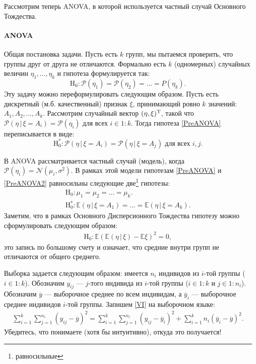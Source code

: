 Рассмотрим теперь ANOVA, в которой используется частный случай Основного Тождества.
\paragraph{ANOVA}
Общая постановка задачи.
Пусть есть $k$ групп, мы пытаемся проверить, что группы друг от друга не отличаются.
Формально есть $k$ (одномерных) случайных величин $\eta_1, \ldots, \eta_k$ и гипотеза формулируется так:
\begin{equation}
    \label{PreANOVA}
    \mathrm H_0: \mathcal P(\eta_1) = \mathcal P(\eta_2) = \ldots \mathcal =P(\eta_k).
\end{equation}
Эту задачу можно переформулировать следующим образом.
Пусть есть дискретный (м.б. качественный) признак $\xi$, принимающий ровно $k$ значений: $A_1, A_2, \ldots, A_k$.
Рассмотрим случайный вектор $(\eta, \xi)^{\mathrm{T}}$, такой что $\mathcal P(\eta \, | \, \xi = A_i) = \mathcal P(\eta_i)$ для всех $i \in 1:k$.
Тогда гипотеза \eqref{PreANOVA} переписывается в виде:
\begin{equation}
    \label{PreANOVA2}
    \mathrm H_0^*: \mathcal P(\eta \, | \, \xi = A_i) = \mathcal P(\eta \, | \, \xi = A_j) \text{ для всех $i, j$}.
\end{equation}

В ANOVA рассматривается частный случай (модель), когда $\mathcal P(\eta_i) = \mathcal N(\mu_i, \sigma^2)$.
В рамках этой модели гипотезам \eqref{PreANOVA} и \eqref{PreANOVA2} равносильны следующие две\footnote{равносильные} гипотезы:
\begin{gather}
    \label{ANOVA}
    \mathrm H_0: \mu_1 = \mu_2 = \ldots = \mu_k.\\
    \mathrm H_0^*: \mathbb E (\eta \, | \, \xi = A_1) = \ldots = \mathbb E (\eta \, | \, \xi = A_k).
\end{gather}
Заметим, что в рамках Основного Дисперсионного Тождества гипотезу можно сформулировать следующим образом:
\begin{gather}
    \label{ANOVA_VI_H}
    \mathrm H_0: \mathbb E(\mathbb E(\eta\, | \, \xi) - \mathbb E \xi)^2 = 0,
\end{gather}
это запись по большому счету и означает, что средние внутри групп не отличаются от общего среднего.

Выборка задается следующим образом: имеется $n_i$ индивидов из $i$-той группы ($i \in 1:k$).
Обозначим $y_{ij}$ --- $j$-того индивида из $i$-той группы ($i \in 1:k$ и $j \in 1:n_i$).
Обозначим $\overline y$ --- выборочное среднее по всем индивидам, а $\overline y_i$ --- выборочное среднее индивидов $i$-той группы.
Запишем \eqref{VI} на выборочном языке:
\begin{gather}
    \label{VI_ANOVA}
    \sum_{i=1}^k \sum_{j=1}^{n_i} (y_{ij} - \overline y)^2 = \sum_{i=1}^k \sum_{j=1}^{n_i} (y_{ij} - \overline y_i)^2 + \sum_{i=1}^k n_i (\overline y_i - \overline y)^2.
\end{gather}
Убедитесь, что понимаете (хотя бы интуитивно), откуда это получается!


